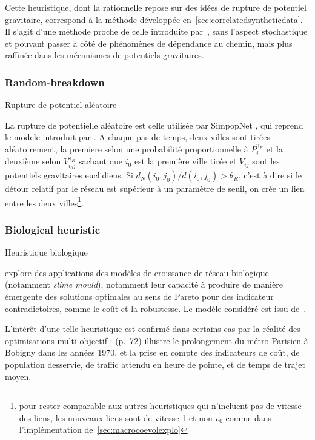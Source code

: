 Cette heuristique, dont la rationnelle repose sur des idées de rupture de potentiel gravitaire, correspond à la méthode développée en~\ref{sec:correlatedsyntheticdata}. Il s'agit d'une méthode proche de celle introduite par~\cite{schmitt2014modelisation}, sans l'aspect stochastique et pouvant passer à côté de phénomènes de dépendance au chemin, mais plus raffinée dans les mécanismes de potentiels gravitaires.



\subsubsection{Random-breakdown}{Rupture de potentiel aléatoire}

La rupture de potentielle aléatoire est celle utilisée par SimpopNet \cite{schmitt2014modelisation}, qui reprend le modele introduit par \cite{blumenfeld2010network}. A chaque pas de temps, deux villes sont tirées aléatoirement, la premiere selon une probabilité proportionnelle à $P_i^{\gamma_R}$ et la deuxième selon $V_{i_0j}^{\gamma_R}$ sachant que $i_0$ est la première ville tirée et $V_{ij}$ sont les potentiels gravitaires euclidiens. Si $d_N(i_0,j_0) / d(i_0,j_0) > \theta_R$, c'est à dire si le détour relatif par le réseau est supérieur à un paramètre de seuil, on crée un lien entre les deux villes\footnote{pour rester comparable aux autres heuristiques qui n'incluent pas de vitesse des liens, les nouveaux liens sont de vitesse 1 et non $v_0$ comme dans l'implémentation de~\ref{sec:macrocoevolexplo}}.







\subsubsection{Biological heuristic}{Heuristique biologique}

\cite{raimbault2015labex} explore des applications des modèles de croissance de réseau biologique (notamment \emph{slime mould}), notamment leur capacité à produire de manière émergente des solutions optimales au sens de Pareto pour des indicateur contradictoires, comme le coût et la robustesse. Le modèle considéré est issu de~\cite{tero2010rules}.

L'intérêt d'une telle heuristique est confirmé dans certains cas par la réalité des optimisations multi-objectif : \cite{padeiro:tel-00438092} (p.~72) illustre le prolongement du métro Parisien à Bobigny dans les années 1970, et la prise en compte des indicateurs de coût, de population desservie, de traffic attendu en heure de pointe, et de temps de trajet moyen.

